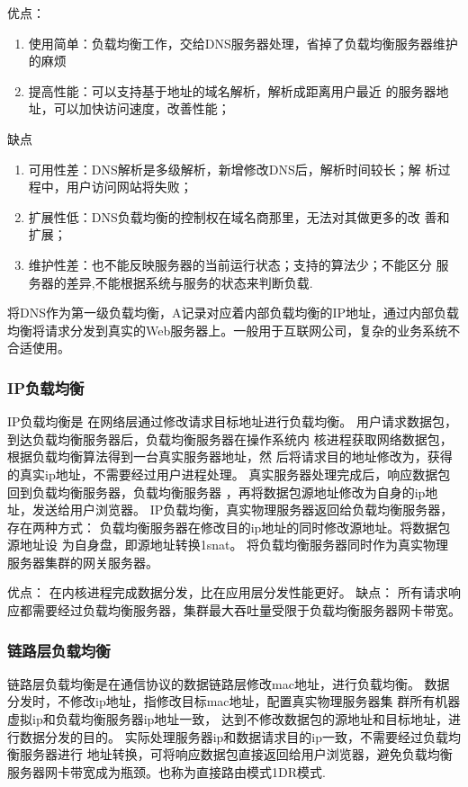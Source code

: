 \noindent
优点：
\begin{enumerate}
	\item 使用简单：负载均衡工作，交给DNS服务器处理，省掉了负载均衡服务器维护的麻烦
	\item 提高性能：可以支持基于地址的域名解析，解析成距离用户最近
	的服务器地址，可以加快访问速度，改善性能；
\end{enumerate}

\noindent
缺点
\begin{enumerate}
	\item 可用性差：DNS解析是多级解析，新增修改DNS后，解析时间较长；解
	析过程中，用户访问网站将失败；
	\item 扩展性低：DNS负载均衡的控制权在域名商那里，无法对其做更多的改
	善和扩展；
	\item 维护性差：也不能反映服务器的当前运行状态；支持的算法少；不能区分
	服务器的差异,不能根据系统与服务的状态来判断负载.
\end{enumerate}

将DNS作为第一级负载均衡，A记录对应着内部负载均衡的IP地址，通过内部负载
均衡将请求分发到真实的Web服务器上。一般用于互联网公司，复杂的业务系统不合适使用。
\subsubsection{IP负载均衡}
IP负载均衡是
在网络层通过修改请求目标地址进行负载均衡。
用户请求数据包，到达负载均衡服务器后，负载均衡服务器在操作系统内
核进程获取网络数据包，根据负载均衡算法得到一台真实服务器地址，然
后将请求目的地址修改为，获得的真实ip地址，不需要经过用户进程处理。
真实服务器处理完成后，响应数据包回到负载均衡服务器，负载均衡服务器
，再将数据包源地址修改为自身的ip地址，发送给用户浏览器。
IP负载均衡，真实物理服务器返回给负载均衡服务器，存在两种方式：
负载均衡服务器在修改目的ip地址的同时修改源地址。将数据包源地址设
为自身盘，即源地址转换1snat。
将负载均衡服务器同时作为真实物理服务器集群的网关服务器。

优点：
	在内核进程完成数据分发，比在应用层分发性能更好。
缺点：
所有请求响应都需要经过负载均衡服务器，集群最大吞吐量受限于负载均衡服务器网卡带宽。
\subsubsection{链路层负载均衡}
链路层负载均衡是在通信协议的数据链路层修改mac地址，进行负载均衡。
数据分发时，不修改ip地址，指修改目标mac地址，配置真实物理服务器集
群所有机器虚拟ip和负载均衡服务器ip地址一致，
达到不修改数据包的源地址和目标地址，进行数据分发的目的。
实际处理服务器ip和数据请求目的ip一致，不需要经过负载均衡服务器进行
地址转换，可将响应数据包直接返回给用户浏览器，避免负载均衡
服务器网卡带宽成为瓶颈。也称为直接路由模式1DR模式.

